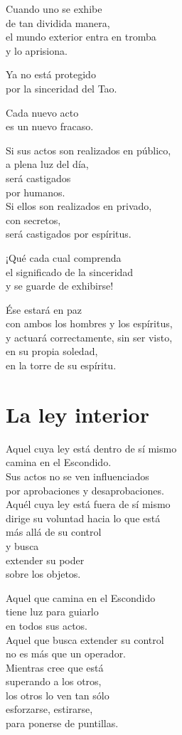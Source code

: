 \documentclass[hidelinks]{memoir}
\begin{document}
	Cuando uno se exhibe\\
	de tan dividida manera,\\
	el mundo exterior entra en tromba\\
	y lo aprisiona.
	
	Ya no está protegido\\
	por la sinceridad del Tao.
	
	Cada nuevo acto\\
	es un nuevo fracaso.
	
	Si sus actos son realizados en público,\\
	a plena luz del día,\\
	será castigados\\
	por humanos.\\
	Si ellos son realizados en privado,\\
	con secretos,\\
	será castigados por espíritus.
	
	¡Qué cada cual comprenda\\
	el significado de la sinceridad\\
	y se guarde de exhibirse!
	
	Ése estará en paz\\
	con ambos los hombres y los espíritus,\\
	y actuará correctamente, sin ser visto,\\
	en su propia soledad,\\
	en la torre de su espíritu.
	
	\chapter*{La ley interior}
	
	Aquel cuya ley está dentro de sí mismo\\
	camina en el Escondido.\\
	Sus actos no se ven influenciados\\
	por aprobaciones y desaprobaciones.\\
	Aquél cuya ley está fuera de sí mismo\\
	dirige su voluntad hacia lo que está\\
	más allá de su control\\
	y busca\\
	extender su poder\\
	sobre los objetos.
	
	Aquel que camina en el Escondido\\
	tiene luz para guiarlo\\
	en todos sus actos.\\
	Aquel que busca extender su control\\
	no es más que un operador.\\
	Mientras cree que está\\
	superando a los otros,\\
	los otros lo ven tan sólo\\
	esforzarse, estirarse,\\
	para ponerse de puntillas.
	
\end{document}
